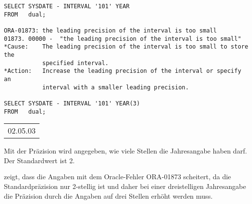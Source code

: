 \begin{lstlisting}[language=oracle_sql,caption={Richtiger Umgang mit YEAR TO MONTH Intervallen},label=sql03_20]
SELECT SYSDATE - INTERVAL '101' YEAR
FROM   dual;

ORA-01873: the leading precision of the interval is too small 
01873. 00000 -  "the leading precision of the interval is too small"
*Cause:    The leading precision of the interval is too small to store the
           specified interval.
*Action:   Increase the leading precision of the interval or specify an
           interval with a smaller leading precision.

SELECT SYSDATE - INTERVAL '101' YEAR(3)
FROM   dual;
          \end{lstlisting}
\begin{center}
    \begin{small}
        \tablehead{}
        \begin{oraclesql}
            \begin{supertabular}{l}
                02.05.03 \\
            \end{supertabular}
        \end{oraclesql}
    \end{small}
\end{center}
\begin{merke}
    Mit der Präzision wird angegeben, wie viele Stellen die
    Jahresangabe haben darf. Der Standardwert ist 2.
\end{merke}
 zeigt, dass die Angaben  mit dem Oracle-Fehler ORA-01873 scheitert, da die
Standardpräzision nur 2-stellig ist und daher bei einer
dreistelligen Jahresangabe die Präzision durch die Angaben
 auf drei Stellen erhöht werden muss.

